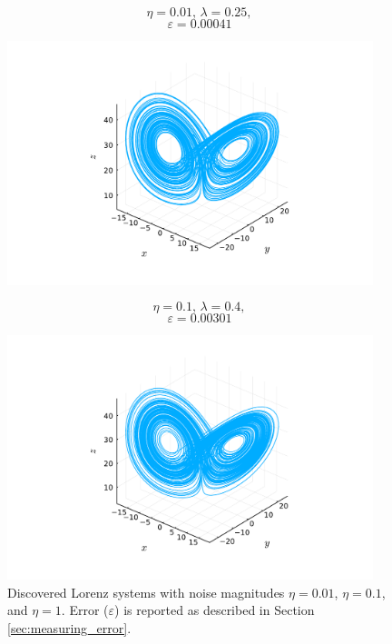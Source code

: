 \documentclass[10pt]{paper}
\begin{document}
\begin{figure}[h]
	\caption{Discovered Lorenz systems with noise magnitudes $\eta = 0.01$, $\eta = 0.1$, and $\eta = 1$. Error ($\varepsilon$) is reported as described in Section \ref{sec:measuring_error}.}
	\label{fig:found_lorenz_systems}

	\centering 
	\begin{minipage}{0.32\textwidth}
		\[ \eta = 0.01, \, \lambda = 0.25, \]
		\[ \varepsilon = 0.00041 \]
		\begin{center}
			\includegraphics[width = 0.95\textwidth, trim={4.3cm, 1.6cm, 4.3cm, 2.5cm}, clip]{found_lorenz_001.pdf}
		\end{center}
	\end{minipage}%
	\begin{minipage}{0.32\textwidth}
		\[ \eta = 0.1, \, \lambda = 0.4, \]
		\[ \varepsilon = 0.00301 \]
		\begin{center}
			\includegraphics[width = 0.95\textwidth, trim={4.3cm, 1.6cm, 4.3cm, 2.5cm}, clip]{found_lorenz_01.pdf}

\end{center}
\end{minipage}
\end{figure}
\end{document}
